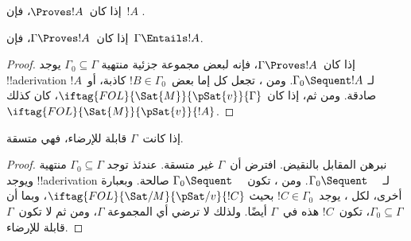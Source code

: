 \documentclass[../../../include/open-logic-section]{subfiles}
\begin{document}
\begin{cor}
إذا كان~$\Proves !A$، فإن~$!A$ .
\end{cor}

\begin{cor}
إذا كان~$\Gamma \Proves !A$، فإن~$\Gamma \Entails !A$.
\end{cor}

\begin{proof}
إذا كان~$\Gamma \Proves !A$، فإنه لبعض مجموعة جزئية منتهية
$\Gamma_0 \subseteq \Gamma$ يوجد !!a{derivation} لـ
$\Gamma_0 \Sequent !A$. ومن ، تجعل كل
إما بعض~$!B \in \Gamma_0$ كاذبة، أو~$!A$ صادقة. ومن ثم، إذا كان
$\iftag{FOL}{\Sat{M}}{\pSat{v}}{\Gamma}$، كان كذلك
$\iftag{FOL}{\Sat{M}}{\pSat{v}}{!A}$.
\end{proof}

\begin{cor}
إذا كانت~$\Gamma$ قابلة للإرضاء، فهي متسقة.
\end{cor}

\begin{proof}
نبرهن المقابل بالنقيض. افترض أن~$\Gamma$ غير متسقة. عندئذ توجد
$\Gamma_0 \subseteq \Gamma$ منتهية ويوجد !!a{derivation} لـ
$\Gamma_0 \Sequent \quad$. ومن ، تكون
$\Gamma_0 \Sequent \quad$ صالحة. وبعبارة أخرى، لكل
،
يوجد~$!C \in \Gamma_0$ بحيث
$\iftag{FOL}{\Sat/{M}}{\pSat/{v}}{!C}$، وبما أن
$\Gamma_0 \subseteq \Gamma$، تكون~$!C$ هذه في~$\Gamma$ أيضًا.
ولذلك لا ترضي أي  المجموعة
$\Gamma$، ومن ثم لا تكون~$\Gamma$ قابلة للإرضاء.
\end{proof}
\end{document}
